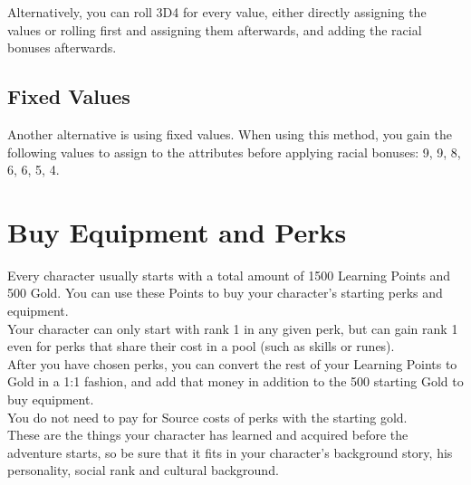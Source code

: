 Alternatively, you can roll 3D4 for every value, either directly assigning the values or rolling first and assigning them afterwards, and adding the racial bonuses afterwards. 


\subsection{Fixed Values}\label{subsec:pointFixed}

Another alternative is using fixed values.
When using this method, you gain the following values to assign to the attributes before applying racial bonuses: 9, 9, 8, 6, 6, 5, 4.


\section{Buy Equipment and Perks}\label{sec:charCreationPerkAndEquip}

Every character usually starts with a total amount of 1500 Learning Points and 500 Gold.
You can use these Points to buy your character's starting perks and equipment.\\
Your character can only start with rank 1 in any given perk, but can gain rank 1 even for perks that share their cost in a pool (such as skills or runes).\\
After you have chosen perks, you can convert the rest of your Learning Points to Gold in a 1:1 fashion, and add that money in addition to the 500 starting Gold to buy equipment.\\
You do not need to pay for Source costs of perks with the starting gold.\\
These are the things your character has learned and acquired before the adventure starts, so be sure that it fits in your character's background story, his personality, social rank and cultural background.\\